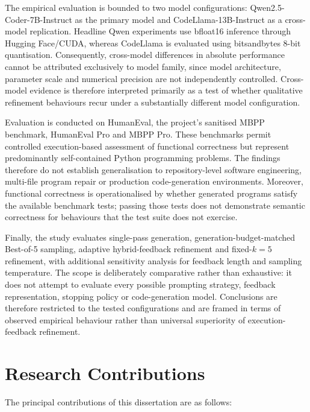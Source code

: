 The empirical evaluation is bounded to two model configurations: Qwen2.5-Coder-7B-Instruct as the primary model and CodeLlama-13B-Instruct as a cross-model replication. Headline Qwen experiments use bfloat16 inference through Hugging Face/CUDA, whereas CodeLlama is evaluated using bitsandbytes 8-bit quantisation. Consequently, cross-model differences in absolute performance cannot be attributed exclusively to model family, since model architecture, parameter scale and numerical precision are not independently controlled. Cross-model evidence is therefore interpreted primarily as a test of whether qualitative refinement behaviours recur under a substantially different model configuration.

Evaluation is conducted on HumanEval, the project's sanitised MBPP benchmark, HumanEval Pro and MBPP Pro. These benchmarks permit controlled execution-based assessment of functional correctness but represent predominantly self-contained Python programming problems. The findings therefore do not establish generalisation to repository-level software engineering, multi-file program repair or production code-generation environments. Moreover, functional correctness is operationalised by whether generated programs satisfy the available benchmark tests; passing those tests does not demonstrate semantic correctness for behaviours that the test suite does not exercise.

Finally, the study evaluates single-pass generation, generation-budget-matched Best-of-5 sampling, adaptive hybrid-feedback refinement and fixed-$k=5$ refinement, with additional sensitivity analysis for feedback length and sampling temperature. The scope is deliberately comparative rather than exhaustive: it does not attempt to evaluate every possible prompting strategy, feedback representation, stopping policy or code-generation model. Conclusions are therefore restricted to the tested configurations and are framed in terms of observed empirical behaviour rather than universal superiority of execution-feedback refinement.

\section{Research Contributions}

The principal contributions of this dissertation are as follows:

